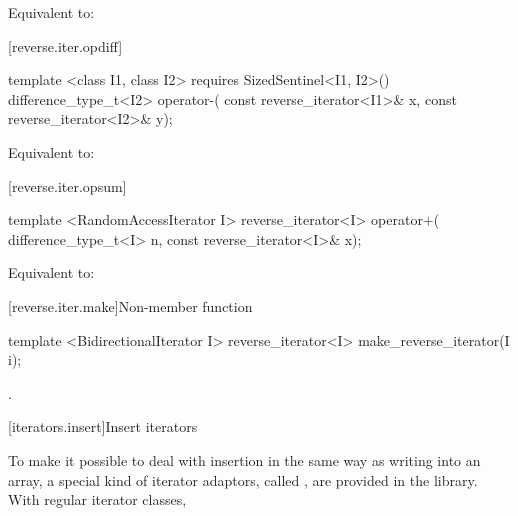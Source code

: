 \begin{itemdescr}
\pnum
\effects Equivalent to:
\end{itemdescr}

[reverse.iter.opdiff]{}

%
\begin{itemdecl}
template <class I1, class I2>
    requires SizedSentinel<I1, I2>()
  difference_type_t<I2> operator-(
    const reverse_iterator<I1>& x,
    const reverse_iterator<I2>& y);
\end{itemdecl}

\begin{itemdescr}
\pnum
\effects Equivalent to:
\end{itemdescr}

[reverse.iter.opsum]{}

%
\begin{itemdecl}
template <RandomAccessIterator I>
  reverse_iterator<I>
    operator+(
  difference_type_t<I> n,
  const reverse_iterator<I>& x);
\end{itemdecl}

\begin{itemdescr}
\pnum
\effects Equivalent to:
\end{itemdescr}

[reverse.iter.make]{Non-member function }

%
\begin{itemdecl}
template <BidirectionalIterator I>
  reverse_iterator<I> make_reverse_iterator(I i);
\end{itemdecl}

\begin{itemdescr}
\pnum
\returns
{}.
\end{itemdescr}

[iterators.insert]{Insert iterators}

\pnum
To make it possible to deal with insertion in the same way as writing into an array, a special kind of iterator
adaptors, called
,
are provided in the library.
With regular iterator classes,

